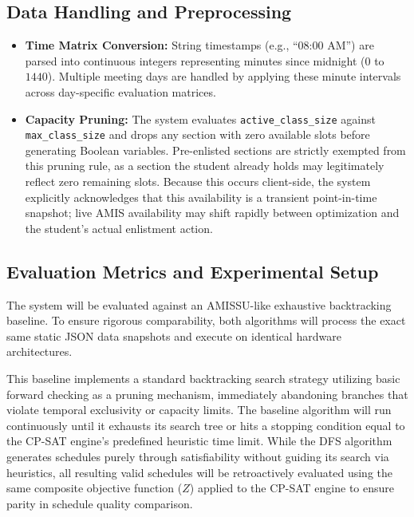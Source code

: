 \documentclass{icsthesis}
\begin{document}
\begin{mainmatter}
		\subsection{Data Handling and Preprocessing}
		
		\begin{itemize}
			\item \textbf{Time Matrix Conversion:} String timestamps (e.g., ``08:00 AM'') are parsed into continuous integers representing minutes since midnight ($0$ to $1440$). Multiple meeting days are handled by applying these minute intervals across day-specific evaluation matrices.
			
			\item \textbf{Capacity Pruning:} The system evaluates \texttt{active\_class\_size} against \texttt{max\_class\_size} and drops any section with zero available slots before generating Boolean variables. Pre-enlisted sections are strictly exempted from this pruning rule, as a section the student already holds may legitimately reflect zero remaining slots. Because this occurs client-side, the system explicitly acknowledges that this availability is a transient point-in-time snapshot; live AMIS availability may shift rapidly between optimization and the student's actual enlistment action.
		\end{itemize}
		
		\subsection{Evaluation Metrics and Experimental Setup}
		
		The system will be evaluated against an AMISSU-like exhaustive backtracking baseline. To ensure rigorous comparability, both algorithms will process the exact same static JSON data snapshots and execute on identical hardware architectures.
		
		This baseline implements a standard backtracking search strategy utilizing basic forward checking as a pruning mechanism, immediately abandoning branches that violate temporal exclusivity or capacity limits. The baseline algorithm will run continuously until it exhausts its search tree or hits a stopping condition equal to the CP-SAT engine's predefined heuristic time limit. While the DFS algorithm generates schedules purely through satisfiability without guiding its search via heuristics, all resulting valid schedules will be retroactively evaluated using the same composite objective function ($Z$) applied to the CP-SAT engine to ensure parity in schedule quality comparison.
		

\end{mainmatter}
\end{document}
